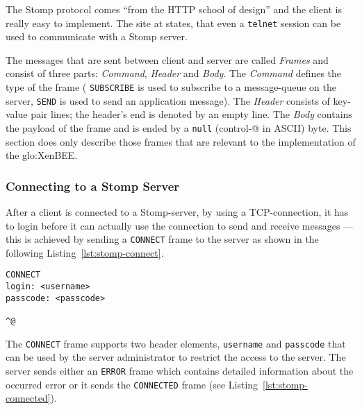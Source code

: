 The Stomp protocol comes ``from the HTTP school of design'' and the client
is really easy to implement. The  site at \cite{stomp} states, that even a
\texttt{telnet} session can be used to communicate with a Stomp server.

The  messages  that  are  sent   between  client  and  server  are  called
\emph{Frames}  and consist of  three parts:  \emph{Command}, \emph{Header}
and \emph{Body}.   The \emph{Command} defines  the type of the  frame (\eg
\texttt{SUBSCRIBE} is used to subscribe  to a message-queue on the server,
\texttt{SEND} is  used to send an application  message). The \emph{Header}
consists of key-value pair lines; the  header's end is denoted by an empty
line. The \emph{Body} contains the payload  of the frame and is ended by a
\texttt{null} (control-@  in ASCII) byte. This section  does only describe
those   frames  that   are   relevant  to   the   implementation  of   the
\gls{glo:XenBEE}.

\subsubsection{Connecting to a Stomp Server}

After  a  client   is  connected  to  a  Stomp-server,   \eg  by  using  a
TCP-connection, it has to login  before it can actually use the connection
to  send  and  receive  messages   ---  this  is  achieved  by  sending  a
\texttt{CONNECT}  frame   to  the  server   as  shown  in   the  following
Listing~\ref{lst:stomp-connect}.

\medskip
\begin{center}
  \begin{minipage}{.75\textwidth}
    \begin{lstlisting}[captionpos=b,backgroundcolor=\color{listingcolor},frame=lines,numbers=none,stepnumber=5,numberfirstline=false,numberstyle=\tiny,caption={The initial
      \texttt{CONNECT} message sent by a Stomp client.},label={lst:stomp-connect}]
CONNECT
login: <username>
passcode: <passcode>

^@
    \end{lstlisting}
  \end{minipage}
\end{center}

The \texttt{CONNECT} frame supports two header elements, \texttt{username}
and  \texttt{passcode} that  can be  used by  the server  administrator to
restrict  the  access   to  the  server.   The  server   sends  either  an
\texttt{ERROR}  frame  which   contains  detailed  information  about  the
occurred   error   or  it   sends   the   \texttt{CONNECTED}  frame   (see
Listing~\ref{lst:stomp-connected}).

